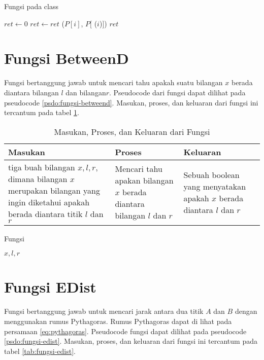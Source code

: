 \begin{algorithm}
    \caption{Fungsi  pada class }
	\label{psdo:class-polygon-perimeter}
    \begin{algorithmic}[1]
        \State $ret \leftarrow 0$
            \State $ret \leftarrow ret $ ($P[i]$, $P[$ ($i$)$] $)
        \EndFor
        \State \Return $ret$
	\end{algorithmic}
\end{algorithm}

\section{Fungsi BetweenD}
\label{sec:fungsi-betweend}
Fungsi  bertanggung jawab untuk mencari tahu apakah suatu bilangan $x$ berada diantara bilangan $l$ dan bilangan$r$. Pseudocode dari fungsi  dapat dilihat pada pseudocode \ref{psdo:fungsi-betweend}. Masukan, proses, dan keluaran dari fungsi ini tercantum pada tabel \ref{tab:fungsi-betweend}.

\begin{table}[]
	\Centering
	\begin{tabular}{|p{3cm}|p{3cm}|p{3cm}|}
	\hline
	Masukan   & Proses     & Keluaran \\ \hline
	tiga buah bilangan $x,l,r$, dimana bilangan $x$ merupakan bilangan yang ingin diketahui apakah berada diantara titik $l$ dan $r$ & Mencari tahu apakan bilangan $x$ berada diantara bilangan $l$ dan $r$ &   Sebuah boolean yang menyatakan apakah $x$ berada diantara $l$ dan $r$     \\ \hline
	\end{tabular}
	\caption{Masukan, Proses, dan Keluaran dari Fungsi  }
	\label{tab:fungsi-betweend}
\end{table}
\begin{algorithm}
    \caption{Fungsi }
	\label{psdo:fungsi-betweend}
    \begin{algorithmic}[1]
        \Require $x, l, r$
            \State \Return {}
        \Else
            \State \Return {}
        \EndIf
	\end{algorithmic}
\end{algorithm}


\section{Fungsi EDist}
\label{sec:fungsi-edist}
Fungsi  bertanggung jawab untuk mencari jarak antara dua titik  $A$ dan  $B$ dengan menggunakan rumus Pythagoras. Rumus Pythagoras dapat di lihat pada persamaan \ref{eq:pythagoras}. Pseudocode fungsi  dapat dilihat pada pseudocode \ref{psdo:fungsi-edist}. Masukan, proses, dan keluaran dari fungsi ini tercantum pada tabel \ref{tab:fungsi-edist}.

